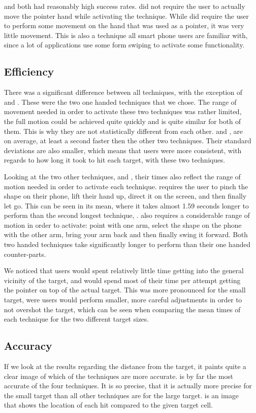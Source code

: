 \swipe and \throw both had reasonably high success rates. \throw did not require the user to actually move the pointer hand while activating the technique. While \swipe did require the user to perform some movement on the hand that was used as a pointer, it was very little movement. This is also a technique all smart phone users are familiar with, since a lot of applications use some form swiping to activate some functionality.

\subsection{Efficiency}
There was a significant difference between all techniques, with the exception of \swipe and \tilt. These were the two one handed techniques that we chose. The range of movement needed in order to activate these two techniques was rather limited, the full motion could be achieved quite quickly and is quite similar for both of them. 
This is why they are not statistically different from each other. \swipe and \tilt, are on average, at least a second faster then the other two techniques.
Their standard deviations are also smaller, which means that users were more consistent, with regards to how long it took to hit each target, with these two techniques. 

Looking at the two other techniques, \pinch and \throw, their times also reflect the range of motion needed in order to activate each technique. \pinch requires the user to pinch the shape on their phone, lift their hand up, direct it on the screen, and then finally let go. This can be seen in its mean, where it takes almost 1.59 seconds longer to perform than the second longest technique, \throw. \throw also requires a considerable range of motion in order to activate: point with one arm, select the shape on the phone with the other arm, bring your arm back and then finally swing it forward. Both two handed techniques take significantly longer to perform than their one handed counter-parts.

We noticed that users would spent relatively little time getting into the general vicinity of the target, and would spend most of their time per attempt getting the pointer on top of the actual target. 
This was more pronounced for the small target, were users would perform smaller, more careful adjustments in order to not overshot the target, which can be seen when comparing the mean times of each technique for the two different target sizes.

\subsection{Accuracy}
If we look at the results regarding the distance from the target, it paints quite a clear image of which of the techniques are more accurate. 
\swipe is by far the most accurate of the four techniques.
It is so precise, that it is actually more precise for the small target than all other techniques are for the large target. 
 is an image that shows the location of each hit compared to the given target cell. 

